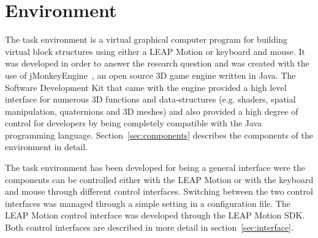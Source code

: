 \section{Environment}


The task environment is a virtual graphical computer program for building virtual block structures using either a LEAP Motion or keyboard and mouse. It was developed in order to answer the research question and was created with the use of jMonkeyEngine~\cite{Irene:2012}, an open source 3D game engine written in Java. The Software Development Kit that came with the engine provided a high level interface for numerous 3D functions and data-structures (e.g. shaders, spatial manipulation, quaternions and 3D meshes) and also provided a high degree of control for developers by being completely compatible with the Java programming language. Section~\ref{sec:components} describes the components of the environment in detail.

The task environment has been developed for being a general interface were the components can be controlled either with the LEAP Motion or with the keyboard and mouse through different control interfaces. Switching between the two control interfaces was managed through a simple setting in a configuration file. The LEAP Motion control interface was developed through the LEAP Motion SDK. Both control interfaces are described in more detail in section~\ref{sec:interface}.





